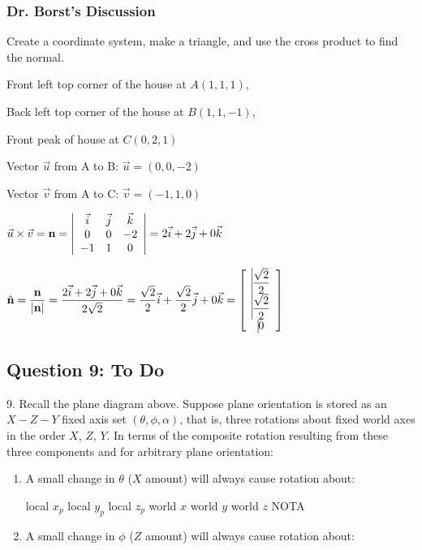\documentclass[11pt]{article}
\begin{document}
\begin{spacing}{1.2}
\subsubsection{Dr. Borst's Discussion}

Create a coordinate system, make a triangle, and use the cross product to find the normal.  

Front left top corner of the house at $A(1,1,1)$,

Back left top corner of the house at $B(1,1,-1)$,

Front peak of house at $\displaystyle C\left( 0,2, 1\right)$

Vector $\vec{u}$ from A to B: $\vec{u} = (0,0,-2)$

Vector $\vec{v}$ from A to C:  $\displaystyle\vec{v} = \left( -1,1, 0 \right)$

$\displaystyle
\vec{u} \times \vec{v} = {\mathbf{n}} = 
\left|
	\begin{array}{ccc}
		\vec{i} & \vec{j} & \vec{k} \cr
		0 & 0 & -2 \cr
		-1 & 1 & 0 \cr
	\end{array}
\right|
= 2\vec{i}  +2\vec{j} + 0\vec{k}
$

$\displaystyle
\hat{\mathbf{n}} = 
\frac{\mathbf{n}}{|\mathbf{n}|}
= \frac{2\vec{i} + 2 \vec{j} + 0 \vec{k}}{2\sqrt2} = \frac{\sqrt2}{2}\vec{i} + \frac{\sqrt2}{2} \vec{j} + 0 \vec{k}
=
\left[
	\begin{array}{>{\displaystyle\vrule width 0pt height 16pt depth 12pt}c}
		\frac{\sqrt2}{2} \cr
		\frac{\sqrt2}{2} \cr
		0 \cr
	\end{array}
\right]
$

\subsection{Question 9:  To Do}
9.  Recall the plane diagram above.  Suppose plane orientation is stored as an $X-Z-Y$ fixed axis set $(\theta, \phi, \alpha)$, that is, three rotations about fixed world axes in the order $X$, $Z$, $Y$.  In terms of the composite rotation resulting from these three components and for arbitrary plane orientation:

\begin{enumerate}[label=\arabic*)]
	\item A small change in $\theta$ ($X$ amount) will always cause rotation about:
	
	local $x_p$ \qquad local $y_p$ \qquad local $z_p$ \qquad world $x$ \qquad world $y$ \qquad world $z$ \qquad NOTA
	\item A small change in $\phi$ ($Z$ amount) will always cause rotation about:
	

\end{enumerate}
\end{spacing}
\end{document}
